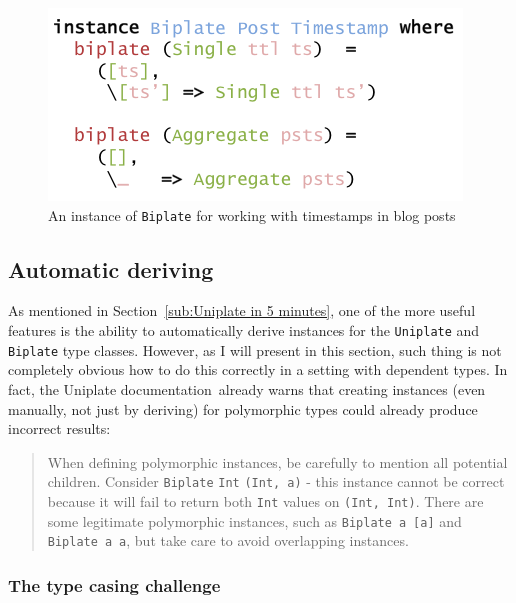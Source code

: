 \documentclass{ituthesis}
\newcommand{\tttype}[1]{\textcolor{type-color}{\texttt{#1}}}
\newcommand{\ttvar}[1]{\textcolor{local-var-color}{\texttt{#1}}}
\theoremstyle{break}
\begin{document}
\begin{figure}[ht]
\begin{center}
    \includegraphics[scale=0.5]{Figures/UniplateInstance.png}
\end{center}
\caption{An instance of \tttype{Biplate} for working with timestamps in blog posts}
\label{fig:uniplatexmpinst}
\end{figure}



\subsection{Automatic deriving}
\label{sub:Automatic deriving}
As mentioned in Section~\ref{sub:Uniplate in 5 minutes}, one of the more useful features is the ability to automatically derive instances for the \tttype{Uniplate} and \tttype{Biplate} type classes.
However, as I will present in this section, such thing is not completely obvious how to do this correctly in a setting with dependent types.
In fact, the Uniplate documentation\,\autocite{mitchell2014uniplate} already warns that creating instances (even manually, not just by deriving) for polymorphic types could already produce
incorrect results:

\blockquote{
When defining polymorphic instances, be carefully to mention all potential children.
Consider \tttype{Biplate} \tttype{Int} \tttype{(Int,}~\ttvar{a}\tttype{)} - this instance cannot be correct because it will fail to return both \tttype{Int} values on \tttype{(Int, Int)}.
There are some legitimate polymorphic instances, such as \tttype{Biplate}~\ttvar{a}~\tttype{[}\ttvar{a}\tttype{]} and \tttype{Biplate}~\ttvar{a}~\ttvar{a}, but take care to avoid overlapping instances.}

\subsubsection{The type casing challenge}
\label{ssub:The type casing challenge}
\end{document}
